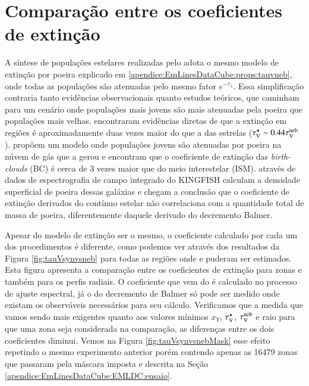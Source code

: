 \section{Comparação entre os coeficientes de extinção}
\label{apendice:synvsneb:tauv}

A síntese de populações estelares realizadas pelo \starlight adota o mesmo modelo de extinção por poeira explicado em \ref{apendice:EmLinesDataCube:props:tauvneb}, onde todas as populações são atenuadas pelo mesmo fator $e^{-\tau_\lambda}$. Essa simplificação contraria tanto evidências observacionais quanto estudos teóricos, que caminham para um cenário onde populações mais jovens são mais atenuadas pela poeira que populações mais velhas. \citet{Calzetti.etal.1994a} encontraram evidências diretas de que a extinção em regiões \Hii é aproximadamente duas vezes maior do que a das estrelas ($\tau_{\mathrm{V}}^\star \sim 0.44 \tau_{\mathrm{V}}^{\mathrm{neb}}$). \citet{Charlot.Fall.2000a} propõem um modelo onde populações jovens são atenuadas por poeira na núvem de gás que a gerou e encontram que o coeficiente de extinção das {\em birth-clouds} (BC) é cerca de 3 vezes maior que  do meio interestelar (ISM). \citet{Kreckel.etal.2013a} através de dados de espectrografia de campo integrado do KINGFISH \citep{Kennicutt.etal.2011a} calculam a densidade superficial de poeira dessas galáxias e chegam a conclusão que o coeficiente de extinção derivados do contínuo estelar não correlaciona com a quantidade total de massa de poeira, diferentemente daquele derivado do decremento Balmer.

Apesar do modelo de extinção ser o mesmo, o coeficiente calculado por cada um dos procedimentos é diferente, como podemos ver através dos resultados da Figura \ref{fig:tauVsynvsneb} para todas as regiões onde \Ha e \Hb puderam ser estimados. Esta figura apresenta a comparação entre os coeficientes de extinção para zonas e também para os perfis radiais. O coeficiente que vem do \starlight é calculado no processo de ajuste espectral, já o do decremento de Balmer só pode ser medido onde existam os observáveis necessários para seu cálculo. Verificamos que a medida que vamos sendo mais exigentes quanto aos valores mínimos $x_Y$, $\tau_{\mathrm{V}}^\star$, $\tau_{\mathrm{V}}^{\mathrm{neb}}$ e raio para que uma zona seja considerada na comparação, as diferenças entre os dois coeficientes diminui. Vemos na Figura \ref{fig:tauVsynvsnebMask} esse efeito repetindo o mesmo experimento anterior porém contendo apenas as 16479 zonas que passaram pela máscara imposta e descrita na Seção \ref{apendice:EmLinesDataCube:EMLDC:ensaio}.

